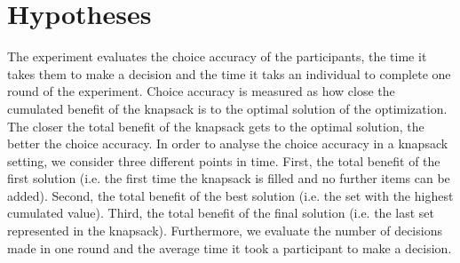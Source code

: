 \section{Hypotheses}
\label{ch:Literature Review:sec:Hypotheses}
The experiment evaluates the choice accuracy of the participants, the time it takes them to make a decision and the time it taks an individual to complete one round of the experiment.
Choice accuracy is measured as how close the cumulated benefit of the knapsack is to the optimal solution of the optimization. The closer the total benefit of the knapsack gets to the optimal solution, the better the choice accuracy.
In order to analyse the choice accuracy in a knapsack setting, we consider three different points in time. First, the total benefit of the first solution (i.e. the first time the knapsack is filled and no further items can be added). Second, the total benefit of the best solution (i.e. the set with the highest cumulated value). Third, the total benefit of the final solution (i.e. the last set represented in the knapsack). Furthermore, we evaluate the number of decisions made in one round and the average time it took a participant to make a decision.


